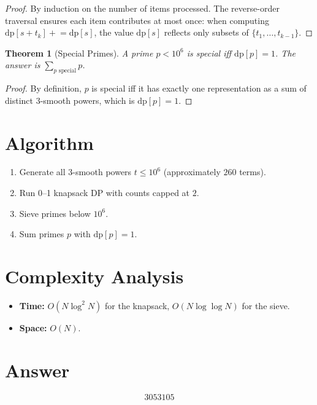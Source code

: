 \documentclass[12pt]{article}
\newtheorem{theorem}{Theorem}
\theoremstyle{definition}
\begin{document}
\begin{proof}
By induction on the number of items processed. The reverse-order traversal ensures each item contributes at most once: when computing $\mathrm{dp}[s + t_k] \mathrel{+}= \mathrm{dp}[s]$, the value $\mathrm{dp}[s]$ reflects only subsets of $\{t_1, \ldots, t_{k-1}\}$.
\end{proof}

\begin{theorem}[Special Primes]
A prime $p < 10^6$ is special iff $\mathrm{dp}[p] = 1$. The answer is $\sum_{p \text{ special}} p$.
\end{theorem}

\begin{proof}
By definition, $p$ is special iff it has exactly one representation as a sum of distinct 3-smooth powers, which is $\mathrm{dp}[p] = 1$.
\end{proof}

\section{Algorithm}

\begin{enumerate}
    \item Generate all 3-smooth powers $t \le 10^6$ (approximately $260$ terms).
    \item Run 0--1 knapsack DP with counts capped at $2$.
    \item Sieve primes below $10^6$.
    \item Sum primes $p$ with $\mathrm{dp}[p] = 1$.
\end{enumerate}

\section{Complexity Analysis}

\begin{itemize}
    \item \textbf{Time:} $O(N \log^2 N)$ for the knapsack, $O(N \log \log N)$ for the sieve.
    \item \textbf{Space:} $O(N)$.
\end{itemize}

\section{Answer}

\[
\boxed{3053105}
\]
\end{document}
